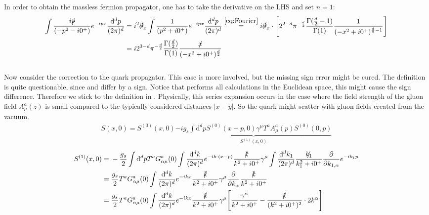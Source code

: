 \documentclass[openright,twoside,12pt,a4paper,final]{article}
\begin{document}
	In order to obtain the massless fermion propagator, one has to take the derivative on the LHS and set $n = 1$:
	\begin{align}
		\int \frac{i\slashed{p}}{(-p^2 - i0^+)} e^{-ipx} \frac{\mathrm{d}^d p}{(2 \pi)^d} =& \; i^2 \slashed{\partial}_x \int \frac{1}{(p^2 + i0^+)} e^{-ipx} \frac{\mathrm{d}^d p}{(2 \pi)^d} \overset{\eqref{eq:Fourier}}{=} i \slashed{\partial}_x \cdot \Bigg[ 2^{2 - d} \pi^{-\frac{d}{2}} \frac{\Gamma(\frac{d}{2} - 1)}{\Gamma(1)} \frac{1}{(-x^2 + i0^+)^{\frac{d}{2} - 1}} \Bigg] \nonumber \\ =& \; i 2^{3 - d} \pi^{-\frac{d}{2}} \frac{\Gamma(\frac{d}{2})}{\Gamma(1)} \frac{\slashed{x}}{(-x^2 + i0^+)^{\frac{d}{2}}}
	\end{align} \\
	Now consider the correction to the quark propagator. This case is more involved, but the missing sign error might be cured. The definition is quite questionable, since \cite{Novikov:1983gd} and \cite{Gelhausen:2015qji} differ by a sign. Notice that \cite{Novikov:1983gd} performs all calculations in the Euclidean space, this might cause the sign difference. Therefore we stick to the definition in \cite{Gelhausen:2015qji}. Physically, this series expansion occurs in the case where the field strength of the gluon field $A^a_{\mu}(z)$ is small compared to the typically considered distances $|x - y|$. So the quark might scatter with gluon fields created from the vacuum.
	\begin{align}
		S(x,0) = S^{(0)}(x,0) \underbrace{-ig_s \int \mathrm{d}^d p S^{(0)}(x - p,0) \gamma^{\mu} T^a A^a_{\mu}(p) S^{(0)}(0,p)}_{S^{(1)}(x,0)}
	\end{align}
	\begin{align}
		S^{(1)}(x,0) =& \; -\frac{g_s}{2} \int \mathrm{d}^d p T^a G^a_{\alpha \mu}(0) \int \frac{\mathrm{d}^dk}{(2 \pi)^d} e^{-ik\cdot(x - p)} \frac{\slashed{k}}{k^2 + i0^+} \gamma^{\mu} \int \frac{\mathrm{d}^dk_1}{(2 \pi)^d} \frac{\slashed{k_1}}{k_1^2 + i0^+} \frac{\partial}{\partial k_{1,\alpha}} e^{-ik_1p} \nonumber \\ =& \;  \frac{g_s}{2} T^a G^a_{\alpha \mu}(0) \int \frac{\mathrm{d}^dk}{(2 \pi)^d} e^{-ikx} \frac{\slashed{k}}{k^2 + i0^+} \gamma^{\mu} \frac{\partial}{\partial k_{\alpha}} \frac{\slashed{k}}{k^2 + i0^+} \nonumber \\ =& \;  \frac{g_s}{2} T^a G^a_{\alpha \mu}(0) \int \frac{\mathrm{d}^dk}{(2 \pi)^d} e^{-ikx} \frac{\slashed{k}}{k^2 + i0^+} \gamma^{\mu} \Bigg[ \frac{\gamma^{\alpha}}{k^2 + i0^+} - \frac{\slashed{k}}{(k^2 + i0^+)^2} \cdot 2 k^{\alpha}\Bigg] \nonumber 
	\end{align}
\end{document}
